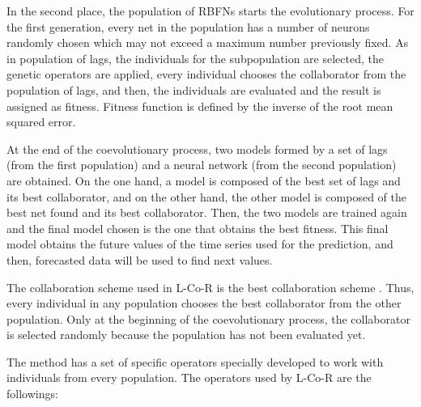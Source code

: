 \documentclass[a4paper,twoside]{article}
\newcommand{\metodo}{L-Co-R}
\begin{document}
In the second place, the population of RBFNs starts the evolutionary process. For the first generation, every net in the population has a number of neurons randomly chosen which may not exceed a maximum number previously fixed. As in population of lags, the individuals for the subpopulation are selected, the genetic operators are applied, every individual chooses the collaborator from the population of lags, and then, the individuals are evaluated and the result is assigned as fitness. Fitness function is defined by the inverse of the root mean squared error.%

At the end of the coevolutionary process, two models formed by a set of lags (from the first population) and a neural network (from the second population) are obtained. On the one hand, a model is composed of the best set of lags and its best collaborator, and on the other hand, the other model is composed of the best net found and its best collaborator. Then, the two models are trained again and the final model chosen is the one that obtains the best fitness. This final model obtains the future values of the time series used for the prediction, and then, forecasted data will be used to find next values.

The collaboration scheme used in {\metodo} is the best collaboration scheme \cite{Potter94}. %
Thus, every individual in any population chooses the best collaborator from the other population. Only at the beginning of the coevolutionary process, the collaborator is selected randomly because the population has not been evaluated yet.

%


The method has a set of specific operators specially developed to work with individuals from every population. %
The operators used by {\metodo} are the followings:
\end{document}
